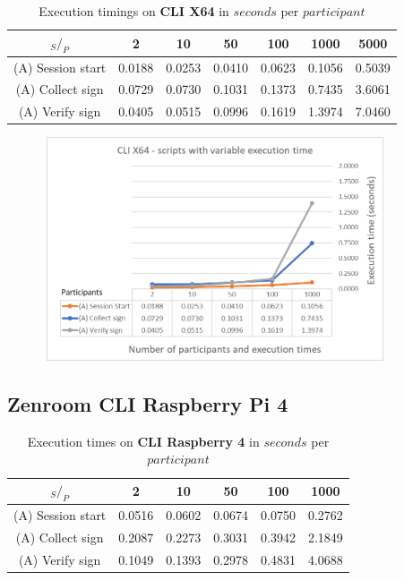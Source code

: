 \documentclass[twocolumn]{article}
\begin{document}
\begin{table}[h!]
  \begin{center}
    \caption{Execution timings on \textbf{CLI X64} in $seconds$ per $participant$}
      \label{tab:table1}
        \begin{tabular} {c|c|c|c|c|c|c}
          \toprule
           \textbf{$_S / _P$} & \textbf{2} & \textbf{10} & \textbf{50} & \textbf{100} & \textbf{1000} & \textbf{5000} \\
          \midrule
          (A) Session start & 0.0188 & 0.0253 & 0.0410 & 0.0623 & 0.1056 & 0.5039 \\
          (A) Collect sign & 0.0729 & 0.0730 & 0.1031 & 0.1373 & 0.7435 & 3.6061 \\
          (A) Verify sign & 0.0405 & 0.0515 & 0.0996 & 0.1619 & 1.3974 & 7.0460 \\
      \bottomrule %
    \end{tabular}
  \end{center}
\end{table}


\begin{figure}[h!]
    \centering
    \includegraphics[width=4in, height=2.6in]{graphs/CLIX64.png}
    \label{fig:galaxy}
\end{figure}




\subsection*{Zenroom CLI Raspberry Pi 4}


\begin{table}[h!]
  \begin{center}
    \caption{Execution times on \textbf{CLI Raspberry 4} in $seconds$ per $participant$}
      \label{tab:table1}
        \begin{tabular} {c|c|c|c|c|c}
          \toprule
           \textbf{$_S / _P$} & \textbf{2} & \textbf{10} & \textbf{50} & \textbf{100} & \textbf{1000} \\
          \midrule
          (A) Session start & 0.0516 & 0.0602 & 0.0674 & 0.0750 & 0.2762 \\
          (A) Collect sign & 0.2087 & 0.2273 & 0.3031 & 0.3942 & 2.1849 \\
          (A) Verify sign & 0.1049 & 0.1393 & 0.2978 & 0.4831 & 4.0688 \\
      \bottomrule %
    \end{tabular}
  \end{center}
\end{table}
\end{document}
